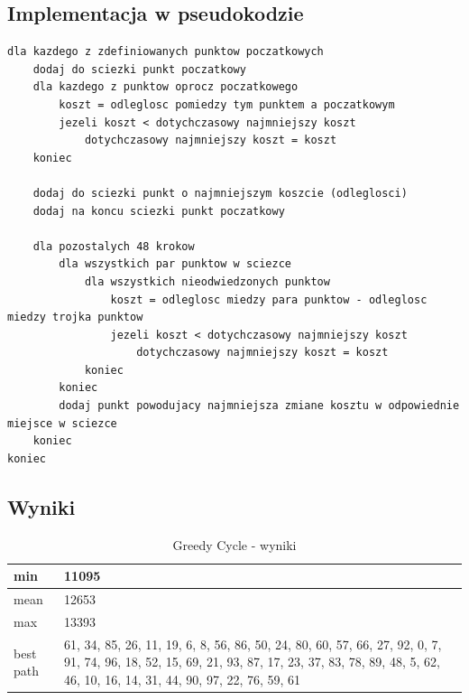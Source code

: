 \documentclass[a4paper 10pt]{article}
\begin{document}
\subsection{Implementacja w pseudokodzie}
\label{Greedy code}
\begin{lstlisting}[frame=single]
dla kazdego z zdefiniowanych punktow poczatkowych
	dodaj do sciezki punkt poczatkowy
	dla kazdego z punktow oprocz poczatkowego
		koszt = odleglosc pomiedzy tym punktem a poczatkowym
		jezeli koszt < dotychczasowy najmniejszy koszt
			dotychczasowy najmniejszy koszt = koszt
	koniec
	
	dodaj do sciezki punkt o najmniejszym koszcie (odleglosci)
	dodaj na koncu sciezki punkt poczatkowy
	
	dla pozostalych 48 krokow
		dla wszystkich par punktow w sciezce
			dla wszystkich nieodwiedzonych punktow
				koszt = odleglosc miedzy para punktow - odleglosc miedzy trojka punktow
				jezeli koszt < dotychczasowy najmniejszy koszt
					dotychczasowy najmniejszy koszt = koszt
			koniec
		koniec
		dodaj punkt powodujacy najmniejsza zmiane kosztu w odpowiednie miejsce w sciezce
	koniec	
koniec

\end{lstlisting}
\subsection{Wyniki}
\begin{table}[H]
\center
\caption{Greedy Cycle - wyniki}
\label{Greedy Cycle - wyniki}
\begin{tabular}{|p{1cm}|p{14cm}|}
\hline
min       & 11095                                                                                                                                                                                                 \\ \hline
mean      & 12653                                                                                                                                                                                                 \\ \hline
max       & 13393                                                                                                                                                                                                 \\ \hline
best path & 61, 34, 85, 26, 11, 19, 6, 8, 56, 86, 50, 24, 80, 60, 57, 66, 27, 92, 0, 7, 91, 74, 96, 18, 52, 15, 69, 21, 93, 87, 17, 23, 37, 83, 78, 89, 48, 5, 62, 46, 10, 16, 14, 31, 44, 90, 97, 22, 76, 59, 61 \\ \hline
\end{tabular}
\end{table}
\end{document}
